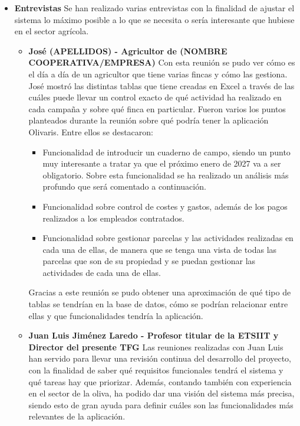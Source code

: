 \begin{itemize}
    \item \textbf{Entrevistas}
    \newline
    Se han realizado varias entrevistas con la finalidad de ajustar el sistema lo máximo posible a lo que se necesita
    o sería interesante que hubiese en el sector agrícola.

    \begin{itemize}
        \item \textbf{José (APELLIDOS) - Agricultor de (NOMBRE COOPERATIVA/EMPRESA)}
        \newline
        Con esta reunión se pudo ver cómo es el día a día de un agricultor que tiene varias fincas y cómo las gestiona.
        José mostró las distintas tablas que tiene creadas en Excel a través de las cuáles puede llevar un control exacto
        de qué actividad ha realizado en cada campaña y sobre qué finca en particular.
        Fueron varios los puntos planteados durante la reunión sobre qué podría tener la aplicación Olivaris. Entre
        ellos se destacaron:

        \begin{itemize}
            \item Funcionalidad de introducir un cuaderno de campo, siendo un punto muy interesante a tratar ya que el 
            próximo enero de 2027 va a ser obligatorio. Sobre esta funcionalidad se ha realizado un análisis más profundo
            que será comentado a continuación.
            \item Funcionalidad sobre control de costes y gastos, además de los pagos realizados a los empleados contratados.
            \item Funcionalidad sobre gestionar parcelas y las actividades realizadas en cada una de ellas, de manera que 
            se tenga una vista de todas las parcelas que son de su propiedad y se puedan gestionar las actividades de cada una
            de ellas. 
        \end{itemize}

        Gracias a este reunión se pudo obtener una aproximación de qué tipo de tablas se tendrían en la base de datos,
        cómo se podrían relacionar entre ellas y que funcionalidades tendría la aplicación.

        \item \textbf{Juan Luis Jiménez Laredo - Profesor titular de la ETSIIT y Director del presente TFG}
        \newline
        Las reuniones realizadas con Juan Luis han servido para llevar una revisión continua del desarrollo del proyecto,
        con la finalidad de saber qué requisitos funcionales tendrá el sistema y qué tareas hay que priorizar.
        Además, contando también con experiencia en el sector de la oliva, ha podido dar una visión del sistema más precisa,
        siendo esto de gran ayuda para definir cuáles son las funcionalidades más relevantes de la aplicación.


\end{itemize}
\end{itemize}
